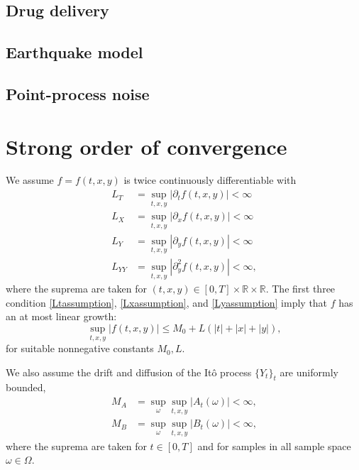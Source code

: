 \documentclass[reqno,12pt]{amsart}
\theoremstyle{plain}%
\theoremstyle{definition}
\begin{document}
\subsection{Drug delivery}

\subsection{Earthquake model}

\subsection{Point-process noise}



\section{Strong order of convergence}

We assume $f=f(t, x, y)$ is twice continuously differentiable with
\begin{align}
  \label{Ltassumption} L_T & = \sup_{t, x, y} |\partial_t f(t, x, y)| < \infty \\
  \label{Lxassumption} L_X & = \sup_{t, x, y} |\partial_x f(t, x, y)| < \infty \\
  \label{Lyassumption} L_Y & = \sup_{t, x, y} |\partial_y f(t, x, y)| < \infty \\
  \label{Lyyassumption} L_{YY} & = \sup_{t, x, y} |\partial_y^2 f(t, x, y)| < \infty,
\end{align}
where the suprema are taken for $(t, x, y) \in [0, T] \times \mathbb{R} \times \mathbb{R}$. The first three condition \eqref{Ltassumption}, \eqref{Lxassumption}, and \eqref{Lyassumption} imply that $f$ has an at most linear growth:
\begin{equation}
    \label{Mfassumption}
    \sup_{t, x, y} |f(t, x, y)| \leq M_0 + L(|t| + |x| + |y|),
\end{equation}
for suitable nonnegative constants $M_0, L$.

We also assume the drift and diffusion of the It\^o process $\{Y_t\}_t$ are uniformly bounded,
\begin{align}
  \label{MAassumption} M_A & = \sup_\omega \sup_{t, x, y} |A_t(\omega)| < \infty, \\
  \label{MBassumption} M_B & = \sup_\omega\sup_{t, x, y} |B_t(\omega)| < \infty,
\end{align}
where the suprema are taken for $t\in [0, T]$ and for samples in all sample space $\omega\in \Omega$.
\end{document}
